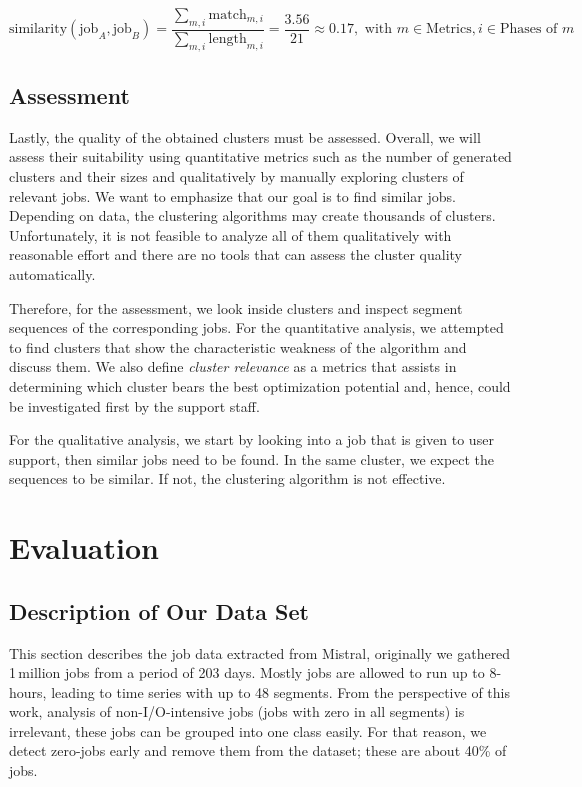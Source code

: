 \documentclass{jhps}
\begin{document}
\begin{equation}
	\text{similarity}(\text{job}_A, \text{job}_B) = \frac{\sum_{m,i}{\text{match}_{m,i}}}{\sum_{m,i}{\text{length}_{m,i}}} = \frac{3.56}{21} \approx 0.17, \text{ with } m \in \text{Metrics}, i \in \text{Phases of } m
\end{equation}


\subsection{Assessment}
Lastly, the quality of the obtained clusters must be assessed.
Overall, we will assess their suitability using quantitative metrics such as the number of generated clusters and their sizes and qualitatively by manually exploring clusters of relevant jobs.
We want to emphasize that our goal is to find similar jobs.
Depending on data, the clustering algorithms may create thousands of clusters.
Unfortunately, it is not feasible to analyze all of them qualitatively with reasonable effort and there are no tools that can assess the cluster quality automatically.

Therefore, for the assessment, we look inside clusters and inspect segment sequences of the corresponding jobs.
For the quantitative analysis, we attempted to find clusters that show the characteristic weakness of the algorithm and discuss them.
We also define \textit{cluster relevance} as a metrics that assists in determining which cluster bears the best optimization potential and, hence, could be investigated first by the support staff.

For the qualitative analysis, we start by looking into a job that is given to user support, then similar jobs need to be found.
In the same cluster, we expect the sequences to be similar.
If not, the clustering algorithm is not effective.


\section{Evaluation}

\subsection{Description of Our Data Set}

This section describes the job data extracted from Mistral, originally we gathered 1\,million jobs from a period of 203 days.
Mostly jobs are allowed to run up to 8-hours, leading to time series with up to 48 segments.
From the perspective of this work, analysis of non-I/O-intensive jobs (jobs with zero in all segments) is irrelevant, these jobs can be grouped into one class easily.
For that reason, we detect zero-jobs early and remove them from the dataset; these are about 40\% of jobs.
\end{document}
